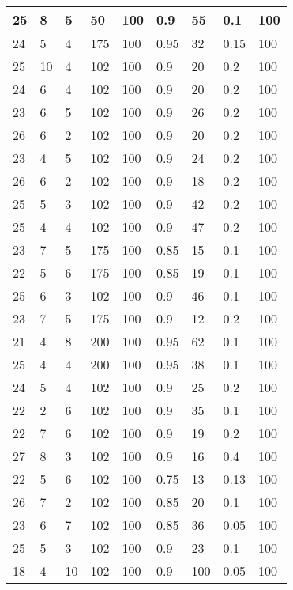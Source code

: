 \begin{table}[!ht]
\begin{tabular}{|l|l|l|l|l|l|l|l|l|}
        25 & 8 & 5 & 50 & 100 & 0.9 & 55 & 0.1 & 100 \\ \hline
        24 & 5 & 4 & 175 & 100 & 0.95 & 32 & 0.15 & 100 \\ \hline
        25 & 10 & 4 & 102 & 100 & 0.9 & 20 & 0.2 & 100 \\ \hline
        24 & 6 & 4 & 102 & 100 & 0.9 & 20 & 0.2 & 100 \\ \hline
        23 & 6 & 5 & 102 & 100 & 0.9 & 26 & 0.2 & 100 \\ \hline
        26 & 6 & 2 & 102 & 100 & 0.9 & 20 & 0.2 & 100 \\ \hline
        23 & 4 & 5 & 102 & 100 & 0.9 & 24 & 0.2 & 100 \\ \hline
        26 & 6 & 2 & 102 & 100 & 0.9 & 18 & 0.2 & 100 \\ \hline
        25 & 5 & 3 & 102 & 100 & 0.9 & 42 & 0.2 & 100 \\ \hline
        25 & 4 & 4 & 102 & 100 & 0.9 & 47 & 0.2 & 100 \\ \hline
        23 & 7 & 5 & 175 & 100 & 0.85 & 15 & 0.1 & 100 \\ \hline
        22 & 5 & 6 & 175 & 100 & 0.85 & 19 & 0.1 & 100 \\ \hline
        25 & 6 & 3 & 102 & 100 & 0.9 & 46 & 0.1 & 100 \\ \hline
        23 & 7 & 5 & 175 & 100 & 0.9 & 12 & 0.2 & 100 \\ \hline
        21 & 4 & 8 & 200 & 100 & 0.95 & 62 & 0.1 & 100 \\ \hline
        25 & 4 & 4 & 200 & 100 & 0.95 & 38 & 0.1 & 100 \\ \hline
        24 & 5 & 4 & 102 & 100 & 0.9 & 25 & 0.2 & 100 \\ \hline
        22 & 2 & 6 & 102 & 100 & 0.9 & 35 & 0.1 & 100 \\ \hline
        22 & 7 & 6 & 102 & 100 & 0.9 & 19 & 0.2 & 100 \\ \hline
        27 & 8 & 3 & 102 & 100 & 0.9 & 16 & 0.4 & 100 \\ \hline
        22 & 5 & 6 & 102 & 100 & 0.75 & 13 & 0.13 & 100 \\ \hline
        26 & 7 & 2 & 102 & 100 & 0.85 & 20 & 0.1 & 100 \\ \hline
        23 & 6 & 7 & 102 & 100 & 0.85 & 36 & 0.05 & 100 \\ \hline
        25 & 5 & 3 & 102 & 100 & 0.9 & 23 & 0.1 & 100 \\ \hline
        18 & 4 & 10 & 102 & 100 & 0.9 & 100 & 0.05 & 100 \\ \hline

\end{tabular}
\end{table}
